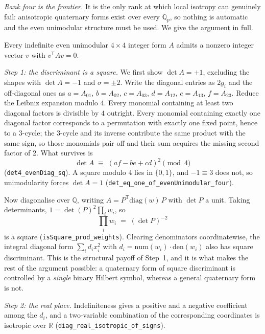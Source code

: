 \emph{Rank four is the frontier.} It is the only rank at which local
isotropy can genuinely fail: anisotropic quaternary forms exist over every
$\mathbb{Q}_p$, so nothing is automatic and the even unimodular structure
must be used. We give the argument in full.

\begin{proposition}
\label{prop:rank4}
Every indefinite even unimodular $4\times 4$ integer form $A$ admits a
nonzero integer vector $v$ with $v^{\mathsf T} A v = 0$.
\end{proposition}

\emph{Step 1: the discriminant is a square.} We first show
$\det A = +1$, excluding the shapes with $\det A = -1$ and
$\sigma = \pm 2$. Write the diagonal entries as $2g_i$ and the
off-diagonal ones as $a = A_{01}$, $b = A_{02}$, $c = A_{03}$,
$d = A_{12}$, $e = A_{13}$, $f = A_{23}$. Reduce the Leibniz expansion
modulo $4$. Every monomial containing at least two diagonal factors is
divisible by $4$ outright. Every monomial containing exactly one diagonal
factor corresponds to a permutation with exactly one fixed point, hence to
a $3$-cycle; the $3$-cycle and its inverse contribute the same product
with the same sign, so those monomials pair off and their sum acquires the
missing second factor of $2$. What survives is
\begin{equation}
\det A \;\equiv\; \left(af - be + cd\right)^2 \pmod 4
\label{eq:det4}
\end{equation}
(\texttt{det4\_evenDiag\_sq}). A square modulo $4$ lies in $\{0,1\}$, and
$-1 \equiv 3$ does not, so unimodularity forces $\det A = 1$
(\texttt{det\_eq\_one\_of\_evenUnimodular\_four}).

Now diagonalise over $\mathbb{Q}$, writing $A = P^{\mathsf T}
\mathrm{diag}(w)\, P$ with $\det P$ a unit. Taking determinants,
$1 = \det(P)^2 \prod_i w_i$, so
\begin{equation}
\prod_{i} w_i \;=\; \left(\det P\right)^{-2}
\label{eq:sqdisc}
\end{equation}
is a square (\texttt{isSquare\_prod\_weights}). Clearing denominators
coordinatewise, the integral diagonal form $\sum_i d_i x_i^2$ with
$d_i = \mathrm{num}(w_i)\cdot\mathrm{den}(w_i)$ also has square
discriminant. This is the structural payoff of Step~1, and it is what
makes the rest of the argument possible: a quaternary form of square
discriminant is controlled by a \emph{single} binary Hilbert symbol,
whereas a general quaternary form is not.

\emph{Step 2: the real place.} Indefiniteness gives a positive and a
negative coefficient among the $d_i$, and a two-variable combination of
the corresponding coordinates is isotropic over $\mathbb{R}$
(\texttt{diag\_real\_isotropic\_of\_signs}).

